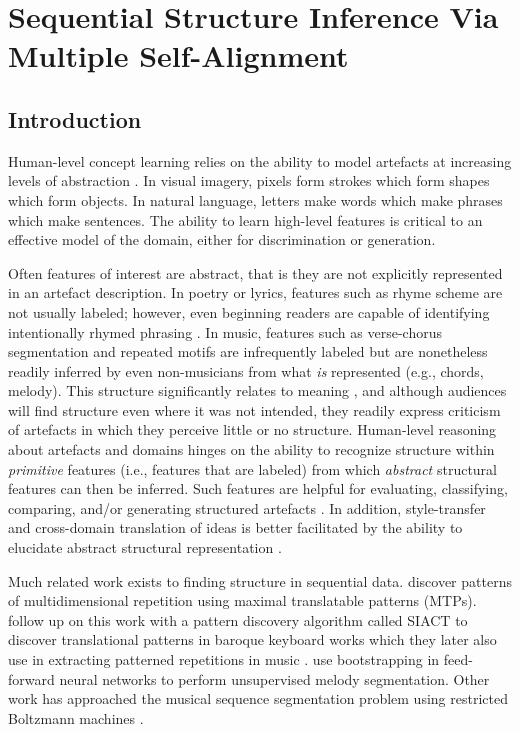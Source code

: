 \documentclass[phd,electronic,oneside,twosidetoc,letterpaper,chaptercenter,parttop,lof,lot]{byumsphd}
\begin{document}
\chapter{Sequential Structure Inference Via Multiple Self-Alignment}

\section{Introduction}

Human-level concept learning relies on the ability to model artefacts at increasing levels of abstraction \cite{Lake2015}. In visual imagery, pixels form strokes which form shapes which form objects. In natural language, letters make words which make phrases which make sentences. The ability to learn high-level features is critical to an effective model of the domain, either for discrimination or generation.

Often features of interest are abstract, that is they are not explicitly represented in an artefact description. In poetry or lyrics, features such as rhyme scheme are not usually labeled; however, even beginning readers are capable of identifying intentionally rhymed phrasing \cite{englemann1974distar}. In music, features such as verse-chorus segmentation and repeated motifs are infrequently labeled but are nonetheless readily inferred by even non-musicians from what \textit{is} represented (e.g., chords, melody). This structure significantly relates to meaning \cite{Nunes2014}, and although audiences will find structure even where it was not intended, they readily express criticism of artefacts in which they perceive little or no structure. Human-level reasoning about artefacts and domains hinges on the ability to recognize structure within \textit{primitive} features (i.e., features that are labeled) from which \textit{abstract} structural features can then be inferred.  Such features are helpful for evaluating, classifying, comparing, and/or generating structured artefacts \cite{Bodily2017ComputationalLearning}. In addition, style-transfer and cross-domain translation of ideas is better facilitated by the ability to elucidate abstract structural representation \cite{lecun2015deep}.

Much related work exists to finding structure in sequential data. \citeauthor{meredith2002algorithms} \cite{meredith2002algorithms} discover patterns of multidimensional repetition using maximal translatable patterns (MTPs). \citeauthor{collins2010comparative} \cite{collins2010comparative} follow up on this work with a pattern discovery algorithm called SIACT to discover translational patterns in baroque keyboard works which they later also use in extracting patterned repetitions in music \cite{collins2017computer}. \citeauthor{lattner2015pseudo} \cite{lattner2015pseudo} use bootstrapping in feed-forward neural networks to perform unsupervised melody segmentation. Other work has approached the musical sequence segmentation problem using restricted Boltzmann machines \cite{lattner2015probabilistic}.
\end{document}
